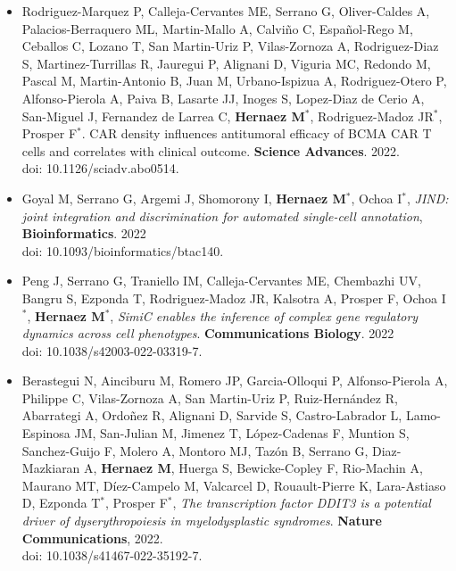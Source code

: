 \documentclass[11pt,a4paper,sans]{moderncv}        %
\begin{document}
\begin{itemize}
\item Rodriguez-Marquez P, Calleja-Cervantes ME, Serrano G, Oliver-Caldes A, Palacios-Berraquero ML, Martin-Mallo A, Calviño C, Español-Rego M, Ceballos C, Lozano T, San Martin-Uriz P, Vilas-Zornoza A, Rodriguez-Diaz S, Martinez-Turrillas R, Jauregui P, Alignani D, Viguria MC, Redondo M, Pascal M, Martin-Antonio B, Juan M, Urbano-Ispizua A, Rodriguez-Otero P, Alfonso-Pierola A, Paiva B, Lasarte JJ, Inoges S, Lopez-Diaz de Cerio A, San-Miguel J, Fernandez de Larrea C, \textbf{Hernaez M}$^{\ast}$, Rodriguez-Madoz JR$^{\ast}$, Prosper F$^{\ast}$. CAR density influences antitumoral efficacy of BCMA CAR T cells and correlates with clinical outcome. \textbf{Science Advances}. 2022.\\
doi: 10.1126/sciadv.abo0514.\\

\item Goyal M, Serrano G, Argemi J, Shomorony I, \textbf{Hernaez M}$^{\ast}$, Ochoa I$^{\ast}$, \textsl{JIND: joint integration and discrimination for automated single-cell annotation}, \textbf{Bioinformatics}. 2022\\ 
doi: 10.1093/bioinformatics/btac140.\\

\item Peng J, Serrano G, Traniello IM, Calleja-Cervantes ME, Chembazhi UV, Bangru S, Ezponda T, Rodriguez-Madoz JR, Kalsotra A, Prosper F, Ochoa I$^{\ast}$, \textbf{Hernaez M}$^{\ast}$, \textsl{SimiC enables the inference of complex gene regulatory dynamics across cell phenotypes}. \textbf{Communications Biology}. 2022\\
doi: 10.1038/s42003-022-03319-7.\\

\item Berastegui N, Ainciburu M, Romero JP, Garcia-Olloqui P, Alfonso-Pierola A, Philippe C, Vilas-Zornoza A, San Martin-Uriz P, Ruiz-Hernández R, Abarrategi A, Ordoñez R, Alignani D, Sarvide S, Castro-Labrador L, Lamo-Espinosa JM, San-Julian M, Jimenez T, López-Cadenas F, Muntion S, Sanchez-Guijo F, Molero A, Montoro MJ, Tazón B, Serrano G, Diaz-Mazkiaran A, \textbf{Hernaez M}, Huerga S, Bewicke-Copley F, Rio-Machin A, Maurano MT, Díez-Campelo M, Valcarcel D, Rouault-Pierre K, Lara-Astiaso D, Ezponda T$^{\ast}$, Prosper F$^{\ast}$, \textsl{The transcription factor DDIT3 is a potential driver of dyserythropoiesis in myelodysplastic syndromes}. \textbf{Nature Communications}, 2022.\\ 
doi: 10.1038/s41467-022-35192-7.\\


\end{itemize}
\end{document}
